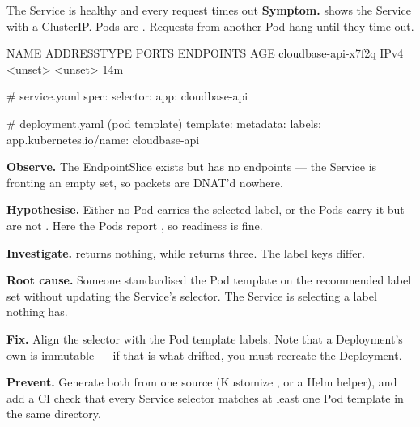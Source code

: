 \begin{debuglab}{The Service is healthy and every request times out}
\textbf{Symptom.}  shows the Service with a ClusterIP. Pods are . Requests from another Pod hang until they time out.

\begin{outbox}
NAME                  ADDRESSTYPE   PORTS   ENDPOINTS   AGE
cloudbase-api-x7f2q   IPv4          <unset> <unset>     14m

# service.yaml
spec:
  selector:
    app: cloudbase-api

# deployment.yaml  (pod template)
  template:
    metadata:
      labels:
        app.kubernetes.io/name: cloudbase-api
\end{outbox}

\begin{tickcheck}
  \item \textbf{Observe.} The EndpointSlice exists but has no endpoints --- the Service is fronting an empty set, so packets are DNAT'd nowhere.
  \item \textbf{Hypothesise.} Either no Pod carries the selected label, or the Pods carry it but are not . Here the Pods report , so readiness is fine.
  \item \textbf{Investigate.}  returns nothing, while  returns three. The label keys differ.
  \item \textbf{Root cause.} Someone standardised the Pod template on the recommended  label set without updating the Service's selector. The Service is selecting a label nothing has.
  \item \textbf{Fix.} Align the selector with the Pod template labels. Note that a Deployment's own  is immutable --- if that is what drifted, you must recreate the Deployment.
  \item \textbf{Prevent.} Generate both from one source (Kustomize , or a Helm helper), and add a CI check that every Service selector matches at least one Pod template in the same directory.
\end{tickcheck}
\end{debuglab}


